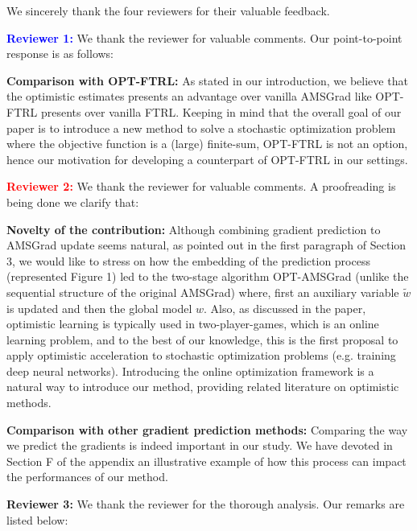 \documentclass{article}
\begin{document}
We sincerely thank the four reviewers for their valuable feedback. 

\vspace{0.02in}

\textbf{\textcolor{blue}{Reviewer 1:}} We thank the reviewer for valuable comments. Our point-to-point response is as follows:\vspace{-5pt}


\textbf{Comparison with OPT-FTRL:} As stated in our introduction, we believe that the optimistic estimates presents an advantage over vanilla AMSGrad like OPT-FTRL presents over vanilla FTRL.
Keeping in mind that the overall goal of our paper is to introduce a new method to solve a stochastic optimization problem where the objective function is a (large) finite-sum, OPT-FTRL is not an option, hence our motivation for developing a counterpart of OPT-FTRL in our settings.

\vspace{0.02in}


\textbf{\textcolor{red}{Reviewer 2:}} We thank the reviewer for valuable comments. A proofreading is being done we clarify that:\vspace{-5pt}

\textbf{Novelty of the contribution:} 
Although combining gradient prediction to AMSGrad update seems natural, as pointed out in the first paragraph of Section 3, we would like to stress on how the embedding of the prediction process (represented Figure 1) led to the two-stage algorithm OPT-AMSGrad (unlike the sequential structure of the original AMSGrad) where, first an auxiliary variable $\tilde{w}$ is updated and then the global model $w$. 
Also, as discussed in the paper, optimistic learning is typically used in two-player-games, which is an online learning problem, and to the best of our knowledge, this is the first proposal to apply optimistic acceleration to stochastic optimization problems (e.g. training deep neural networks). 
Introducing the online optimization framework is a natural way to introduce our method, providing related literature on optimistic methods.\vspace{-5pt}

\textbf{Comparison with other gradient prediction methods:} Comparing the way we predict the gradients is indeed important in our study. We have devoted in Section F of the appendix an illustrative example of how this process can impact the performances of our method. 

\vspace{0.02in}
\textbf{\textcolor{green!50!black}{Reviewer 3:}} We thank the reviewer for the thorough analysis. Our remarks are listed below:\vspace{-5pt}
\end{document}
